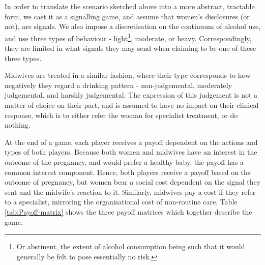 In order to translate the scenario sketched above into a more abstract, tractable form, we cast it as a signalling game, and assume that women's disclosures (or not), are signals. We also impose a discretisation on the continuum of alcohol use, and use three types of behaviour - light\footnote{Or abstinent, the extent of alcohol consumption being such that it would generally be felt to pose essentially no risk.}, moderate, or heavy. Correspondingly, they are limited in what signals they may send when claiming to be one of these three types. 

Midwives are treated in a similar fashion, where their type corresponds to how negatively they regard a drinking pattern - non-judgemental, moderately judgemental, and harshly judgemental. The expression of this judgement is not a matter of choice on their part, and is assumed to have no impact on their clinical response, which is to either refer the woman for specialist treatment, or do nothing.

At the end of a game, each player receives a payoff dependent on the actions and types of both players. Because both women and midwives have an interest in the outcome of the pregnancy, and would prefer a healthy baby, the payoff has a common interest component. Hence, both players receive a payoff based on the outcome of pregnancy, but women bear a social cost dependent on the signal they sent and the midwife's reaction to it. Similarly, midwives pay a cost if they refer to a specialist, mirroring the organisational cost of non-routine care. Table \ref{tab:Payoff-matrix} shows the three payoff matrices which together describe the game.


